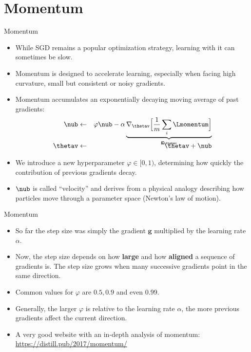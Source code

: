\section{Momentum}
\begin{vbframe}{Momentum}
  \begin{itemize}
    \item While SGD remains a popular optimization strategy, learning with it can sometimes be slow. 
    \item Momentum is designed to accelerate learning, especially when facing high curvature, small but consistent or noisy gradients.
    \item Momentum accumulates an exponentially decaying moving average of past gradients:
      \begin{eqnarray*} 
        \nub &\leftarrow& \varphi \nub - \alpha \underbrace{\nabla_{\thetav} \Big[\frac{1}{m} \sum_{i} \Lmomentum \Big]}_{\mathbf{g}_{\thetav}}\\[-0.3cm]
        \thetav &\leftarrow& \thetav + \nub
      \end{eqnarray*}
    \item We introduce a new hyperparameter $\varphi \in [0, 1)$, determining how quickly the contribution of previous gradients decay.
    \item $\nub$ is called \enquote{velocity} and derives from a physical analogy describing how particles move through a parameter space (Newton's law of motion).
  \end{itemize}
\end{vbframe}

\begin{vbframe}{Momentum}
  \begin{itemize}
    \item So far the step size was simply the gradient $\mathbf{g}$ multiplied by the learning rate $\alpha$.
    \item Now, the step size depends on how \textbf{large} and how \textbf{aligned} a sequence of gradients is. The step size grows when many successive gradients point in the same direction.
    \item Common values for $\varphi$ are $0.5, 0.9$ and even $0.99$.
    \item Generally, the larger $\varphi$ is relative to the learning rate $\alpha$, the more previous gradients affect the current direction.
    \item A very good website with an in-depth analysis of momentum: \url{https://distill.pub/2017/momentum/}

\end{itemize}
\end{vbframe}

